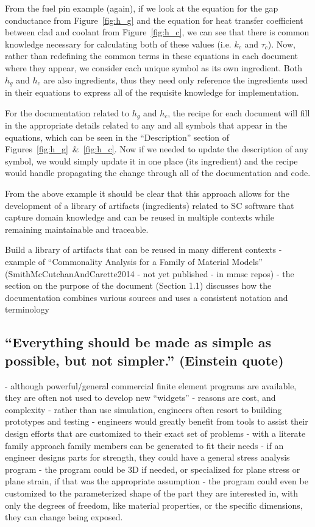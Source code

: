 \documentclass[10pt, preprint]{sigplanconf}
\begin{document}
From the fuel pin example (again), if we look at the equation for the gap
conductance from Figure~\ref{fig:h_g} and the equation for heat transfer 
coefficient between clad and coolant from Figure~\ref{fig:h_c}, 
we can see that there is common knowledge necessary for calculating both 
of these values (i.e. $k_{c}$ and $\tau_c$). Now, rather than redefining the 
common terms in these equations in each document where they appear, 
we consider each unique symbol as its own ingredient. 
Both $h_g$ and $h_c$ are also ingredients, thus they need only
reference the ingredients used in their equations to express all of the
requisite knowledge for implementation.

For the documentation related to $h_g$ and $h_c$, the recipe for each document
will fill in the appropriate details related to any and all symbols that appear
in the equations, which can be seen in the ``Description'' section of 
Figures~\ref{fig:h_g}~\&~\ref{fig:h_c}. Now if we needed to update the 
description of any symbol, we would simply update it in one place (its
ingredient) and the recipe would handle propagating the change through all
of the documentation and code.

From the above example it should be clear that this approach allows for the
development of a library of artifacts (ingredients) related to SC software
that capture domain knowledge and can be reused in multiple contexts while
remaining maintainable and traceable.

Build a library of artifacts that can be reused in many different contexts -
example of “Commonality Analysis for a Family of Material Models”
(SmithMcCutchanAndCarette2014 - not yet published - in mmsc repos) - the section
on the purpose of the document (Section 1.1) discusses how the documentation
combines various sources and uses a consistent notation and terminology

\subsection{``Everything should be made as simple as possible, but not
  simpler.'' (Einstein quote)}  \label{subsec:everything}

- although powerful/general commercial finite element programs are available,
they are often not used to develop new “widgets” - reasons are cost, and
complexity - rather than use simulation, engineers often resort to building
prototypes and testing - engineers would greatly benefit from tools to assist
their design efforts that are customized to their exact set of problems - with a
literate family approach family members can be generated to fit their needs - if
an engineer designs parts for strength, they could have a general stress
analysis program - the program could be 3D if needed, or specialized for plane
stress or plane strain, if that was the appropriate assumption - the program
could even be customized to the parameterized shape of the part they are
interested in, with only the degrees of freedom, like material properties, or
the specific dimensions, they can change being exposed.
\end{document}
